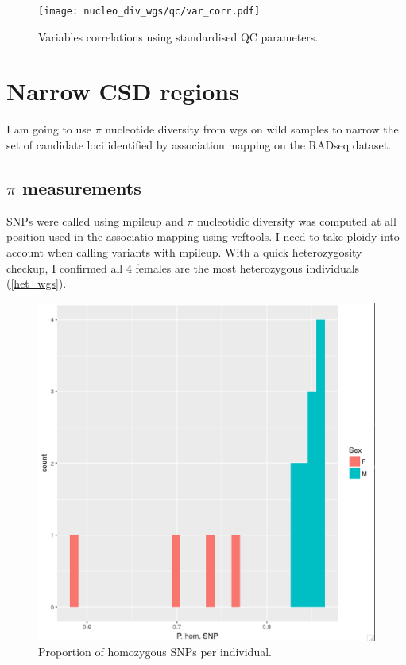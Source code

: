 \documentclass[10pt,a4paper]{report}
\begin{document}
\begin{figure}
\texttt{[image: nucleo\_div\_wgs/qc/var\_corr.pdf]}
\caption{Variables correlations using standardised QC parameters.}
\label{heat_var_QC}
\end{figure}

\section{Narrow CSD regions}
I am going to use $\pi$ nucleotide diversity from wgs on wild samples to narrow the set of candidate loci identified by association mapping on the RADseq dataset.

\subsection{$\pi$ measurements}
SNPs were called using mpileup and $\pi$ nucleotidic diversity was computed at all position used in the associatio mapping using vcftools. I need to take ploidy into account when calling variants with mpileup. With a quick heterozygosity checkup, I confirmed all 4 females are the most heterozygous individuals (\ref{het_wgs}).

\begin{figure}
\includegraphics[width=\textwidth]{nucleo_div_wgs/PI/hom_WGS.png}
\caption{Proportion of homozygous SNPs per individual.}
\label{heat_var_QC}
\end{figure}
\end{document}
